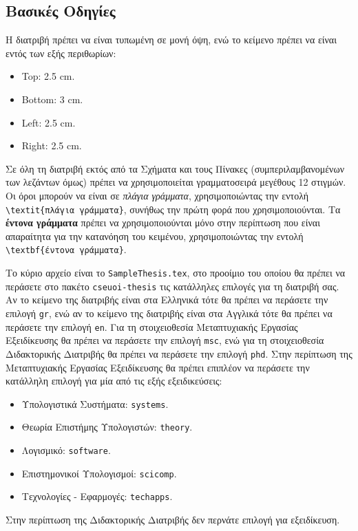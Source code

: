 \subsection{Βασικές Οδηγίες}
\label{subsec:Basic}
Η διατριβή πρέπει να είναι τυπωμένη σε μονή όψη, ενώ το κείμενο πρέπει να είναι εντός των εξής περιθωρίων:
\begin{itemize}
	\item Top: 2.5 cm.
	\item Bottom: 3 cm.
	\item Left: 2.5 cm.
	\item Right: 2.5 cm.
\end{itemize}
Σε όλη τη διατριβή εκτός από τα Σχήματα και τους Πίνακες (συμπεριλαμβανομένων των λεζάντων όμως) πρέπει να χρησιμοποιείται γραμματοσειρά μεγέθους 12 στιγμών.
Οι όροι μπορούν να είναι σε \textit{πλάγια γράμματα}, χρησιμοποιώντας την εντολή \verb|\textit{πλάγια γράμματα}|, συνήθως την πρώτη φορά που χρησιμοποιούνται.
Τα \textbf{έντονα γράμματα} πρέπει να χρησιμοποιούνται μόνο στην περίπτωση που είναι απαραίτητα για την κατανόηση του κειμένου, χρησιμοποιώντας την εντολή \verb|\textbf{έντονα γράμματα}|.

Το κύριο αρχείο είναι το \texttt{SampleThesis.tex}, στο προοίμιο του οποίου θα πρέπει να περάσετε στο πακέτο \texttt{cseuoi-thesis} τις κατάλληλες επιλογές για τη διατριβή σας.
Αν το κείμενο της διατριβής είναι στα Ελληνικά τότε θα πρέπει να περάσετε την επιλογή \texttt{gr}, ενώ αν το κείμενο της διατριβής είναι στα Αγγλικά τότε θα πρέπει να περάσετε την επιλογή \texttt{en}.
Για τη στοιχειοθεσία Μεταπτυχιακής Εργασίας Εξειδίκευσης θα πρέπει να περάσετε την επιλογή \texttt{msc}, ενώ για τη στοιχειοθεσία Διδακτορικής Διατριβής θα πρέπει να περάσετε την επιλογή \texttt{phd}.
Στην περίπτωση της Μεταπτυχιακής Εργασίας Εξειδίκευσης θα πρέπει επιπλέον να περάσετε την κατάλληλη επιλογή για μία από τις εξής εξειδικεύσεις:
\begin{itemize}
	\item Υπολογιστικά Συστήματα: \texttt{systems}.
	\item Θεωρία Επιστήμης Υπολογιστών: \texttt{theory}.
	\item Λογισμικό: \texttt{software}.
	\item Επιστημονικοί Υπολογισμοί: \texttt{scicomp}.
	\item Τεχνολογίες - Εφαρμογές: \texttt{techapps}.
\end{itemize}
Στην περίπτωση της Διδακτορικής Διατριβής δεν περνάτε επιλογή για εξειδίκευση.


